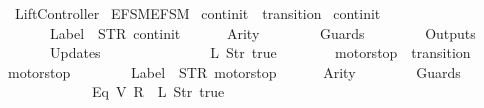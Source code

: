 %
\begin{isabellebody}%
%
%
\isadelimtheory
%
\endisadelimtheory
%
\isatagtheory
{}\isamarkupfalse%
\ Lift{\isacharunderscore}Controller\isanewline
{}\ {\isachardoublequoteopen}EFSM{\isachardot}EFSM{\isachardoublequoteclose}\isanewline
{}%
\endisatagtheory
{\isafoldtheory}%
%
\isadelimtheory
\isanewline
%
\endisadelimtheory
\isanewline
{}\isamarkupfalse%
\ {\isachardoublequoteopen}continit{\isachardoublequoteclose}\ {\isacharcolon}{\isacharcolon}\ {\isachardoublequoteopen}transition{\isachardoublequoteclose}\ \isanewline
{\isachardoublequoteopen}continit\ {\isasymequiv}\ {\isasymlparr}\isanewline
\ \ \ \ \ \ Label\ {\isacharequal}\ STR\ {\isacharprime}{\isacharprime}continit{\isacharprime}{\isacharprime}{\isacharcomma}\isanewline
\ \ \ \ \ \ Arity\ {\isacharequal}\ {}{\isacharcomma}\isanewline
\ \ \ \ \ \ Guards\ {\isacharequal}\ {\isacharbrackleft}{\isacharbrackright}{\isacharcomma}\isanewline
\ \ \ \ \ \ Outputs\ {\isacharequal}\ {\isacharbrackleft}{\isacharbrackright}{\isacharcomma}\isanewline
\ \ \ \ \ \ Updates\ {\isacharequal}\ {\isacharbrackleft}\isanewline
\ \ \ \ \ \ \ \ \ \ \ \ {\isacharparenleft}{}{\isacharcomma}\ {\isacharparenleft}L\ {\isacharparenleft}Str\ {\isacharprime}{\isacharprime}true{\isacharprime}{\isacharprime}{\isacharparenright}{\isacharparenright}{\isacharparenright}\isanewline
\ \ \ \ \ \ {\isacharbrackright}\isanewline
{\isasymrparr}{\isachardoublequoteclose}\isanewline
\isanewline
{}\isamarkupfalse%
\ {\isachardoublequoteopen}motorstop{}{\isachardoublequoteclose}\ {\isacharcolon}{\isacharcolon}\ {\isachardoublequoteopen}transition{\isachardoublequoteclose}\ \isanewline
{\isachardoublequoteopen}motorstop{}\ {\isasymequiv}\ {\isasymlparr}\isanewline
\ \ \ \ \ \ Label\ {\isacharequal}\ STR\ {\isacharprime}{\isacharprime}motorstop{\isacharprime}{\isacharprime}{\isacharcomma}\isanewline
\ \ \ \ \ \ Arity\ {\isacharequal}\ {}{\isacharcomma}\isanewline
\ \ \ \ \ \ Guards\ {\isacharequal}\ {\isacharbrackleft}\isanewline
\ \ \ \ \ \ \ \ \ \ \ \ {\isacharparenleft}Eq\ {\isacharparenleft}V\ {\isacharparenleft}R\ {}{\isacharparenright}{\isacharparenright}\ {\isacharparenleft}L\ {\isacharparenleft}Str\ {\isacharprime}{\isacharprime}true{\isacharprime}{\isacharprime}{\isacharparenright}{\isacharparenright}{\isacharparenright}{\isacharcomma}\isanewline

\end{isabellebody}
